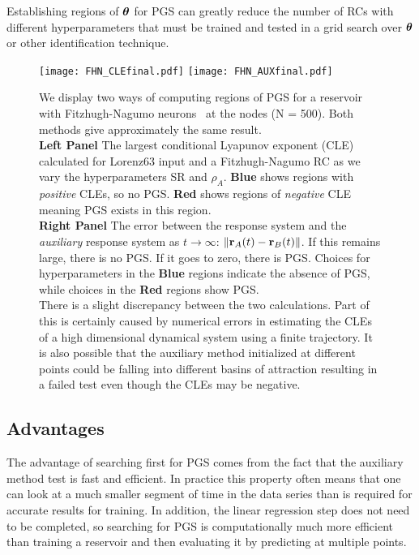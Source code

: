 \documentclass[12pt]{article}
\begin{document}
Establishing regions of $\mbox{$\boldsymbol{\theta}$}$ for PGS can greatly reduce the number of RCs with different hyperparameters that must be trained and tested in a grid search over $\mbox{$\boldsymbol{\theta}$}$ or other identification technique. 
\begin{figure}[!htpb]
    \centering
    \texttt{[image: FHN\_CLEfinal.pdf]}
    \texttt{[image: FHN\_AUXfinal.pdf]}
    \caption{We display two ways of computing regions of PGS for a reservoir  with Fitzhugh-Nagumo neurons~\cite{fitzhugh1961impulses,Nagumo1962} at the nodes (N = 500).  Both methods give approximately the same result.\\ {\bf Left Panel} The largest conditional Lyapunov exponent (CLE) calculated for Lorenz63 input and a Fitzhugh-Nagumo RC as we vary the hyperparameters SR and $\rho_A$.  {\bf Blue} shows regions with {\it positive} CLEs, so no PGS. {\bf Red} shows  regions of {\it negative} CLE meaning PGS exists in this region.\\  {\bf Right Panel} The error between the response system and the {\it auxiliary} response system as $t \to \infty$: $\|\mbox{{\bf r}}_A(t) - \mbox{{\bf r}}_B(t)\|$. If this remains large, there is no PGS. If it goes to zero, there is PGS. Choices for hyperparameters in the {\bf Blue} regions indicate the absence of PGS, while choices in the {\bf Red} regions show PGS.\\ There is a slight discrepancy between the two calculations.  Part of this is certainly caused by numerical errors in estimating the CLEs of a high dimensional dynamical system using a finite trajectory. It is also possible that the auxiliary method initialized at different points could be falling into different basins of attraction resulting in a failed test even though the CLEs may be negative.}
    \label{fig: AUXandCLE_FHN_pnzSR}
\end{figure}

\subsection{Advantages}

The advantage of searching first for PGS comes from the fact that the auxiliary method test is fast and efficient. In practice this property often means that one can look at a much smaller segment of time in the data series than is required for accurate results for training.  In addition, the linear regression step does not need to be completed, so searching for PGS is computationally much more efficient than training a reservoir and then evaluating it by predicting at multiple points. 
\end{document}
